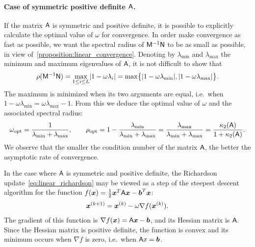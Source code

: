\paragraph{Case of symmetric positive definite $\mathsf A$.}%
\label{par:case_of_symmetric_positive_definite_mat_a_}
If the matrix $\mathsf A$ is symmetric and positive definite,
it is possible to explicitly calculate the optimal value of $\omega$ for convergence.
In order make convergence as fast as possible,
we want the spectral radius of $\mathsf M^{-1} \mathsf N$ to be as small as possible,
in view of~\cref{proposition:linear_convergence}.
Denoting by $\lambda_{\min}$ and $\lambda_{\max}$ the minimum and maximum eigenvalues of $\mathsf A$,
it is not difficult to show that
\[
    \rho(\mathsf M^{-1} \mathsf N)
    = \max_{1 \leq i \leq L} \lvert1  - \omega \lambda_i\rvert
    = \max \bigl\{ \lvert1 - \omega \lambda_{\min}\rvert, \lvert1 - \omega \lambda_{\max}\rvert\bigr\}.
\]
The maximum is minimized when its two arguments are equal,
i.e.\ when $1 - \omega \lambda_{\min} = \omega \lambda_{\max} -1$.
From this we deduce the optimal value of $\omega$ and the associated spectral radius:
\[
    \omega_{\rm opt} = \frac{1}{\lambda_{\min} + \lambda_{\max}},
    \qquad
    \rho_{\rm opt}
    = 1 - \frac{\lambda_{\min}}{\lambda_{\min} + \lambda_{\max}}
    = \frac{\lambda_{\max}}{\lambda_{\min} + \lambda_{\max}}
    =  \frac{\kappa_2(\mathsf A)}{1 + \kappa_2(\mathsf A)}.
\]
We observe that the smaller the condition number of the matrix $\mathsf A$,
the better the asymptotic rate of convergence.

\begin{remark}
    In the case where $\mathsf A$ is symmetric and positive definite,
    the Richardson update~\eqref{eq:linear_richardson} may be viewed as a step of the steepest descent algorithm
    for the function $f(\mathbf{\boldsymbol{x}}) = \frac{1}{2} \mathbf{\boldsymbol{x}}^T \mathsf A \mathbf{\boldsymbol{x}} - \mathbf{\boldsymbol{b}}^T \mathbf{\boldsymbol{x}}$:
    \begin{equation}
        \label{eq:linear_richardson_gradient}
        \mathbf{\boldsymbol{x}}^{(k+1)} = \mathbf{\boldsymbol{x}}^{(k)} - \omega \nabla f(\mathbf{\boldsymbol{x}}^{(k)}).
    \end{equation}
    The gradient of this function is $\nabla f(\mathbf{\boldsymbol{x}}) = \mathsf A \mathbf{\boldsymbol{x}} - \mathbf{\boldsymbol{b}}$,
    and its Hessian matrix is $\mathsf A$.
    Since the Hessian matrix is positive definite, the function is convex
    and its minimum occurs when $\nabla f$ is zero,
    i.e.\ when $\mathsf A x = \mathbf{\boldsymbol{b}}$.
\end{remark}

